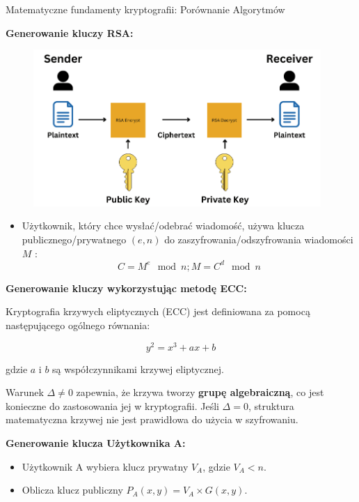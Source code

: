 \documentclass[final]{beamer}
\newlength{\colwidth}
\begin{document}
\begin{frame}[t]
\begin{columns}[t]
\begin{column}{\colwidth}
\begin{block}{Matematyczne fundamenty kryptografii: Porównanie Algorytmów}

\textbf{Generowanie kluczy RSA:}

    \begin{figure}
    \centering
    \includegraphics[width=0.975\textwidth]{images/rsa.png}
    \label{fig:RSA}
    \end{figure}

\begin{itemize}
    \item Użytkownik, który chce wysłać/odebrać wiadomość, używa klucza publicznego/prywatnego \( (e, n) \) do zaszyfrowania/odszyfrowania wiadomości \( M \) :
    \[
    C = M^e \mod n  ; M = C^d \mod n
    \]
\end{itemize}

 \textbf{Generowanie kluczy wykorzystując metodę ECC:}

Kryptografia krzywych eliptycznych (ECC) jest definiowana za pomocą następującego ogólnego równania:

\[
    y^2 = x^3 + ax + b
\]

gdzie $a$ i $b$ są współczynnikami krzywej eliptycznej.


Warunek $\Delta \neq 0$ zapewnia, że krzywa tworzy \textbf{grupę algebraiczną}, co jest konieczne do zastosowania jej w kryptografii. Jeśli $\Delta = 0$, struktura matematyczna krzywej nie jest prawidłowa do użycia w szyfrowaniu.
   
    \textbf{Generowanie klucza Użytkownika A:}
    \begin{itemize}
        \item Użytkownik A wybiera klucz prywatny $V_A$, gdzie $V_A < n$.
        \item Oblicza klucz publiczny $P_A(x, y) = V_A \times G(x, y)$.
    \end{itemize}


\end{block}
\end{column}
\end{columns}
\end{frame}
\end{document}

